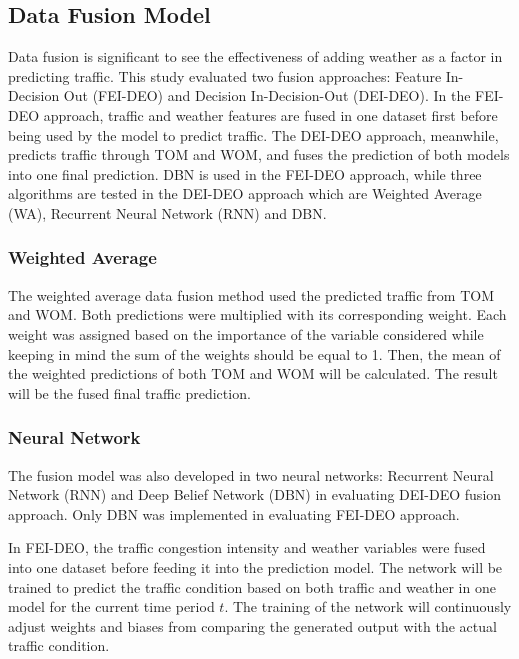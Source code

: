 \subsection{Data Fusion Model}
Data fusion is significant to see the effectiveness of adding weather as a factor in predicting traffic. This study evaluated two fusion approaches: Feature In-Decision Out (FEI-DEO) and Decision In-Decision-Out (DEI-DEO). In the FEI-DEO approach, traffic and weather features are fused in one dataset first before being used by the model to predict traffic. The DEI-DEO approach, meanwhile, predicts traffic through TOM and WOM, and fuses the prediction of both models into one final prediction. DBN is used in the FEI-DEO approach, while three algorithms are tested in the DEI-DEO approach which are Weighted Average (WA), Recurrent Neural Network (RNN) and DBN. 



\subsubsection{Weighted Average}
The weighted average data fusion method used the predicted traffic from TOM and WOM. Both predictions were multiplied with its corresponding weight. Each weight was assigned based on the importance of the variable considered while keeping in mind the sum of the weights should be equal to 1. Then, the mean of the weighted predictions of both TOM and WOM will be calculated. The result will be the fused final traffic prediction.



\subsubsection{Neural Network}
The fusion model was also developed in two neural networks: Recurrent Neural Network (RNN) and Deep Belief Network (DBN) in evaluating DEI-DEO fusion approach. Only DBN was implemented in evaluating FEI-DEO approach.

In FEI-DEO, the traffic congestion intensity and weather variables were fused into one dataset before feeding it into the prediction model. The network will be trained to predict the traffic condition based on both traffic and weather in one model for the current time period $t$. The training of the network will continuously adjust weights and biases from comparing the generated output with the actual traffic condition. 


